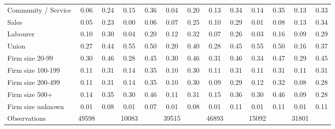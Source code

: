 {\begin{tabular}{l*{6}{cc}}
Community / Service &        0.06&        0.24&        0.15&        0.36&        0.04&        0.20&        0.13&        0.34&        0.14&        0.35&        0.13&        0.33\\
Sales               &        0.05&        0.23&        0.00&        0.06&        0.07&        0.25&        0.10&        0.29&        0.01&        0.08&        0.13&        0.34\\
Labourer            &        0.10&        0.30&        0.04&        0.20&        0.12&        0.32&        0.07&        0.26&        0.03&        0.16&        0.09&        0.29\\
Union               &        0.27&        0.44&        0.55&        0.50&        0.20&        0.40&        0.28&        0.45&        0.55&        0.50&        0.16&        0.37\\
Firm size 20-99     &        0.30&        0.46&        0.28&        0.45&        0.30&        0.46&        0.31&        0.46&        0.34&        0.47&        0.29&        0.45\\
Firm size 100-199   &        0.11&        0.31&        0.14&        0.35&        0.10&        0.30&        0.11&        0.31&        0.11&        0.31&        0.11&        0.31\\
Firm size 200-499   &        0.11&        0.31&        0.14&        0.35&        0.10&        0.30&        0.09&        0.29&        0.12&        0.32&        0.08&        0.28\\
Firm size 500+      &        0.14&        0.35&        0.30&        0.46&        0.11&        0.31&        0.15&        0.36&        0.30&        0.46&        0.09&        0.28\\
Firm size unknown   &        0.01&        0.08&        0.01&        0.07&        0.01&        0.08&        0.01&        0.11&        0.01&        0.11&        0.01&        0.11\\
\hline
Observations        &       49598&            &       10083&            &       39515&            &       46893&            &       15092&            &       31801&            \\
\hline\hline
\end{tabular}
}
